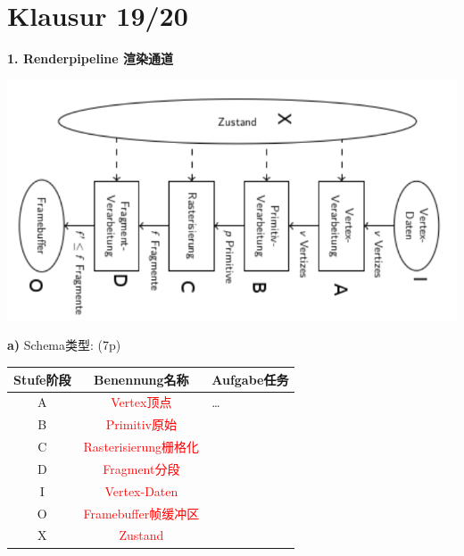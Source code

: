 \documentclass[fleqn]{article}
\begin{document}

\tableofcontents

\pagestyle{main}

\section{Klausur 19/20}

\textbf{1. Renderpipeline 渲染通道}

\includegraphics[scale=0.8]{1.png}

\indent \textbf{a)} Schema类型: (7p)

\begin{center}
    \begin{tabular}{|c|c|l|}
        \hline
        Stufe阶段&Benennung名称&Aufgabe任务\qquad\qquad\qquad\qquad\qquad\qquad\qquad\qquad\\
        \hline
        A&\textcolor{red}{Vertex顶点}&\dots\\
        \hline
        B&\textcolor{red}{Primitiv原始}&\\
        \hline
        C&\textcolor{red}{Rasterisierung栅格化}&\\
        \hline
        D&\textcolor{red}{Fragment分段}&\\
        \hline
        I&\textcolor{red}{Vertex-Daten}&\\
        \hline
        O&\textcolor{red}{Framebuffer帧缓冲区}&\\
        \hline
        X&\textcolor{red}{Zustand}&\\
        \hline
    \end{tabular}
\end{center}
\end{document}
